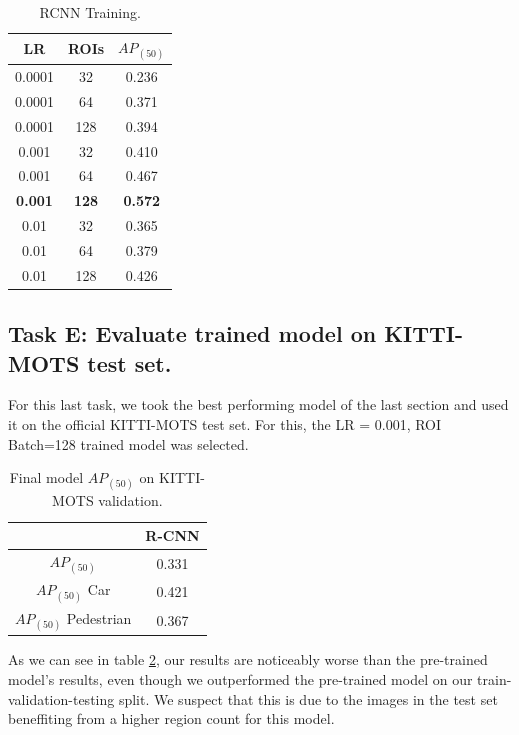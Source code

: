 \documentclass[12pt,a4paper,twocolumn,twoside]{article}
\begin{document}
\begin{table}[ht]
    \centering
    \begin{tabular}{|c | c || c|} 
        \hline
        \textbf{LR} & \textbf{ROIs} & \textbf{$AP_{(50)}$} \\ [0.8ex] 
            \hline
            0.0001 & 32 & 0.236 \\ 
            \hline
            0.0001 & 64 & 0.371\\ 
            \hline
            0.0001 & 128 & 0.394 \\ 
            \hline
            0.001 & 32 & 0.410\\ 
            \hline
            0.001 & 64 & 0.467\\ 
            \hline
            \textbf{0.001} & \textbf{128} & \textbf{0.572}\\ 
            \hline
            0.01 & 32 & 0.365\\ 
            \hline
            0.01 & 64 & 0.379\\ 
            \hline
            0.01 & 128 & 0.426\\ 
         \hline
    \end{tabular}
    \caption{\label{table:RCNN_Table_training}RCNN Training.}
\end{table}

\subsection{Task E: Evaluate trained model on KITTI-MOTS test set.}

For this last task, we took the best performing model of the last section and used
it on the official KITTI-MOTS test set. For this, the LR = 0.001, ROI Batch=128 
trained model was selected. 


\begin{table}[ht]
    \centering
    \begin{tabular}{|c || c |} 
        \hline
          & \textbf{R-CNN}\\ [0.8ex] 
          \hline
         $AP_{(50)}$ & 0.331\\ 
         \hline
         $AP_{(50)}$ Car & 0.421\\
         \hline
         $AP_{(50)}$ Pedestrian & 0.367\\
         \hline
    \end{tabular}
    \caption{\label{table:KITTI-MOTS-FINAL}Final model $AP_{(50)}$ on KITTI-MOTS validation.}
\end{table}

As we can see in table \ref{table:KITTI-MOTS-FINAL}, our results are noticeably 
worse than the pre-trained model's results, even though we outperformed 
the pre-trained model on our train-validation-testing split. We suspect that this is due
to the images in the test set beneffiting from a higher region count for this model.

\printbibliography
\end{document}
